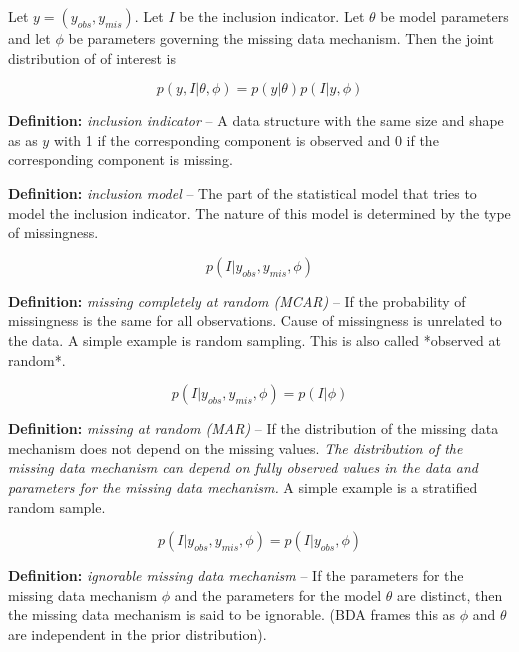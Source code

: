 \documentclass[11pt]{article}
\begin{document}
Let $y = (y_{obs}, y_{mis})$. Let $I$ be the inclusion indicator. Let $\theta$ be model parameters and let $\phi$ be parameters governing the missing data mechanism. Then the joint distribution of of interest is 

$$p(y, I|\theta, \phi) = p(y|\theta)p(I|y, \phi)$$

\vspace{0.25in}

\textbf{Definition:} \textit{inclusion indicator} -- A data structure with the same size and shape as as $y$ with 1 if the corresponding component is observed and 0 if the corresponding component is missing.

\vspace{0.25in}

\textbf{Definition:} \textit{inclusion model} -- The part of the statistical model that tries to model the inclusion indicator. The nature of this model is determined by the type of missingness. 

$$p(I|y_{obs}, y_{mis}, \phi)$$

\vspace{0.25in}

\textbf{Definition:} \textit{missing completely at random (MCAR)} -- If the probability of missingness is the same for all observations. Cause of missingness is unrelated to the data. A simple example is random sampling. This is also called *observed at random*.

$$p(I|y_{obs}, y_{mis}, \phi) = p(I| \phi)$$


\vspace{0.25in}

\textbf{Definition:} \textit{missing at random (MAR)} -- If the distribution of the missing data mechanism does not depend on the missing values. \textit{The distribution of the missing data mechanism can depend on fully observed values in the data and parameters for the missing data mechanism.} A simple example is a stratified random sample. 

$$p(I|y_{obs}, y_{mis}, \phi) = p(I|y_{obs}, \phi)$$

\vspace{0.25in}

\textbf{Definition:} \textit{ignorable missing data mechanism} -- If the parameters for the missing data mechanism $\phi$ and the parameters for the model $\theta$ are distinct, then the missing data mechanism is said to be ignorable. (BDA frames this as $\phi$ and $\theta$ are independent in the prior distribution). 
\end{document}
